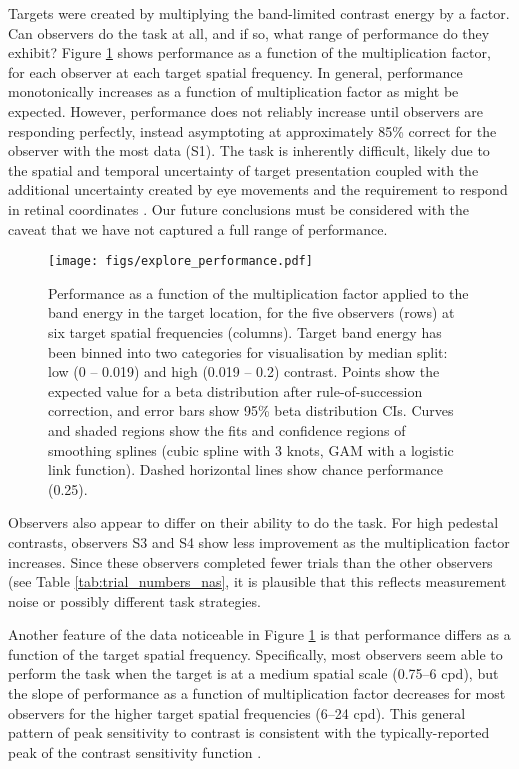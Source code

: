\documentclass[11pt,a4paper]{article}
\begin{document}
Targets were created by multiplying the band-limited contrast energy by a factor.
Can observers do the task at all, and if so, what range of performance do they exhibit?
Figure \ref{fig:explore_performance} shows performance as a function of the multiplication factor, for each observer at each target spatial frequency.
In general, performance monotonically increases as a function of multiplication factor as might be expected.
However, performance does not reliably increase until observers are responding perfectly, instead asymptoting at approximately 85\% correct for the observer with the most data (S1).
The task is inherently difficult, likely due to the spatial and temporal uncertainty of target presentation coupled with the additional uncertainty created by eye movements and the requirement to respond in retinal coordinates \citep[see also][]{Dorr2013}.
Our future conclusions must be considered with the caveat that we have not captured a full range of performance.

\begin{figure}[H]
\texttt{[image: figs/explore\_performance.pdf]}
\centering
\caption{
Performance as a function of the multiplication factor applied to the band energy in the target location, for the five observers (rows) at six target spatial frequencies (columns).
Target band energy has been binned into two categories for visualisation by median split: low (0 -- 0.019) and high (0.019 -- 0.2) contrast.
Points show the expected value for a beta distribution after rule-of-succession correction, and error bars show 95\% beta distribution CIs.
Curves and shaded regions show the fits and confidence regions of smoothing splines (cubic spline with 3 knots, GAM with a logistic link function).
Dashed horizontal lines show chance performance (0.25).
}
\label{fig:explore_performance}
\end{figure}

Observers also appear to differ on their ability to do the task.
For high pedestal contrasts, observers S3 and S4 show less improvement as the multiplication factor increases.
Since these observers completed fewer trials than the other observers (see Table \ref{tab:trial_numbers_nas}, it is plausible that this reflects measurement noise or possibly different task strategies.

Another feature of the data noticeable in Figure \ref{fig:explore_performance} is that performance differs as a function of the target spatial frequency.
Specifically, most observers seem able to perform the task when the target is at a medium spatial scale (0.75--6 cpd), but the slope of performance as a function of multiplication factor decreases for most observers for the higher target spatial frequencies (6--24 cpd).
This general pattern of peak sensitivity to contrast is consistent with the typically-reported peak of the contrast sensitivity function \citep[1--3~cpd;][]{Campbell1968}.
\end{document}
